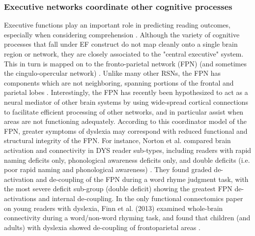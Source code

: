 \subsubsection{Executive networks coordinate other cognitive processes} 
Executive functions play an important role in predicting reading outcomes, especially when considering comprehension \cite{Cutting2008}. Although the variety of cognitive processes that fall under EF construct do not map cleanly onto a single brain region or network, they are closely associated to the "central executive" system. This in turn is mapped on to the fronto-parietal network (FPN) (and sometimes the cingulo-opercular network) \cite{Fedorenko2013, Cocchi2013}. Unlike many other RSNs, the FPN has components which are not neighboring, spanning portions of the frontal and parietal lobes \cite{Yeo2011}. Interestingly, the FPN has recently been hypothesized to act as a neural mediator of other brain systems \cite{Mennon2010, Cole2014} by using wide-spread cortical connections to facilitate efficient processing of other networks, and in particular assist when areas are not functioning adequately. According to this coordinator model of the FPN, greater symptoms of dyslexia may correspond with reduced functional and structural integrity of the FPN. For instance, Norton et al. compared brain activation and connectivity in DYS reader sub-types, including readers with rapid naming deficits only, phonological awareness deficits only, and double deficits (i.e. poor rapid naming and phonological awareness) \cite{Norton2014}. They found graded de-activation and de-coupling of the FPN during a word rhyme judgment task, with the most severe deficit sub-group (double deficit) showing the greatest FPN de-activations and internal de-coupling. In the only functional connectomics paper on young readers with dyslexia, Finn et al. (2013) examined whole-brain connectivity during a word/non-word rhyming task, and found that children (and adults) with dyslexia showed de-coupling of frontoparietal areas \cite{Finn2013}. 


